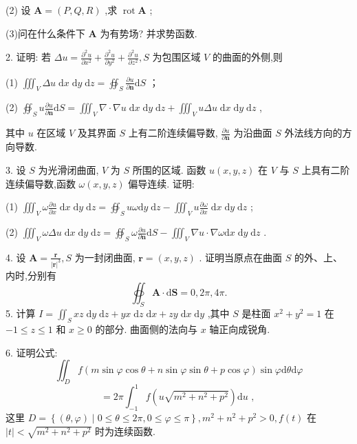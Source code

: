 (2) 设 \(\mathbf{A} = \left( {P,Q,R}\right)\) ,求 \(\operatorname{rot}\mathbf{A}\) ;

(3)问在什么条件下 \(\mathbf{A}\) 为有势场? 并求势函数.

2. 证明: 若 \({\Delta u} = \frac{{\partial }^{2}u}{\partial {x}^{2}} + \frac{{\partial }^{2}u}{\partial {y}^{2}} + \frac{{\partial }^{2}u}{\partial {z}^{2}},S\) 为包围区域 \(V\) 的曲面的外侧,则

(1) \({\iiint }_{V}{\Delta u}\mathrm{\;d}x\mathrm{\;d}y\mathrm{\;d}z = {\oiint }_{S}\frac{\partial u}{\partial \mathbf{n}}\mathrm{d}S\) ；

(2) \({\oiint }_{S}u\frac{\partial u}{\partial \mathbf{n}}\mathrm{d}S = {\iiint }_{V}\nabla  \cdot  \nabla u\mathrm{\;d}x\mathrm{\;d}y\mathrm{\;d}z + {\iiint }_{V}{u\Delta u}\mathrm{\;d}x\mathrm{\;d}y\mathrm{\;d}z\) ,

其中 \(u\) 在区域 \(V\) 及其界面 \(S\) 上有二阶连续偏导数, \(\frac{\partial u}{\partial \mathbf{n}}\) 为沿曲面 \(S\) 外法线方向的方向导数.

3. 设 \(S\) 为光滑闭曲面, \(V\) 为 \(S\) 所围的区域. 函数 \(u\left( {x,y,z}\right)\) 在 \(V\) 与 \(S\) 上具有二阶连续偏导数,函数 \(\omega \left( {x,y,z}\right)\) 偏导连续. 证明:

(1) \({\iiint }_{V}\omega \frac{\partial u}{\partial x}\mathrm{\;d}x\mathrm{\;d}y\mathrm{\;d}z = {\oiint }_{S}{u\omega }\mathrm{d}y\mathrm{\;d}z - {\iiint }_{V}u\frac{\partial \omega }{\partial x}\mathrm{\;d}x\mathrm{\;d}y\mathrm{\;d}z\) ;

(2) \({\iiint }_{V}{\omega \Delta u}\mathrm{\;d}x\mathrm{\;d}y\mathrm{\;d}z = {\oiint }_{S}\omega \frac{\partial u}{\partial \mathbf{n}}\mathrm{d}S - {\iiint }_{V}\nabla u \cdot  \nabla \omega \mathrm{d}x\mathrm{\;d}y\mathrm{\;d}z\) .

4. 设 \(\mathbf{A} = \frac{\mathbf{r}}{{\left| \mathbf{r}\right| }^{3}},S\) 为一封闭曲面, \(\mathbf{r} = \left( {x,y,z}\right)\) . 证明当原点在曲面 \(S\) 的外、上、内时,分别有
\[
{\oiint }_{S}\mathbf{A} \cdot  \mathrm{d}\mathbf{S} = 0,{2\pi },{4\pi }.
\]
5. 计算 \(I = {\iint }_{S}{xz}\mathrm{\;d}y\mathrm{\;d}z + {yx}\mathrm{\;d}z\mathrm{\;d}x + {zy}\mathrm{\;d}x\mathrm{\;d}y\) ,其中 \(S\) 是柱面 \({x}^{2} + {y}^{2} = 1\) 在 \(- 1 \leq  z \leq  1\) 和 \(x \geq  0\) 的部分. 曲面侧的法向与 \(x\) 轴正向成锐角.

6. 证明公式:
\[
{\iint }_{D}f\left( {m\sin \varphi \cos \theta  + n\sin \varphi \sin \theta  + p\cos \varphi }\right) \sin \varphi \mathrm{d}\theta \mathrm{d}\varphi
\]
\[
= {2\pi }{\int }_{-1}^{1}f\left( {u\sqrt{{m}^{2} + {n}^{2} + {p}^{2}}}\right) \mathrm{d}u\text{ , }
\]
这里 \(D = \left\{  {\left( {\theta ,\varphi }\right)  \mid  0 \leq  \theta  \leq  {2\pi },0 \leq  \varphi  \leq  \pi }\right\}  ,{m}^{2} + {n}^{2} + {p}^{2} > 0,f\left( t\right)\) 在 \(\left| t\right|  < \sqrt{{m}^{2} + {n}^{2} + {p}^{2}}\) 时为连续函数.

